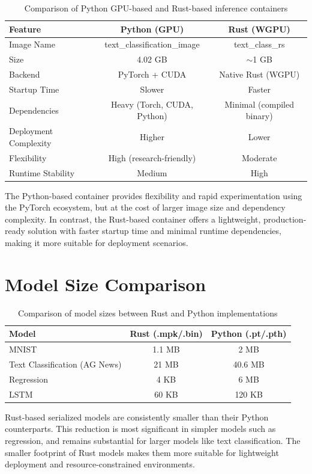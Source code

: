 \documentclass[11pt,a4paper]{article}
\begin{document}
\begin{table}[h]
\centering
\begin{tabular}{|l|c|c|}
\hline
\textbf{Feature} & \textbf{Python (GPU)} & \textbf{Rust (WGPU)} \\
\hline
Image Name & text\_classification\_image & text\_class\_rs \\
\hline
Size & 4.02 GB & $\sim$1 GB \\
\hline
Backend & PyTorch + CUDA & Native Rust (WGPU) \\
\hline
Startup Time & Slower & Faster \\
\hline
Dependencies & Heavy (Torch, CUDA, Python) & Minimal (compiled binary) \\
\hline
Deployment Complexity & Higher & Lower \\
\hline
Flexibility & High (research-friendly) & Moderate \\
\hline
Runtime Stability & Medium & High \\
\hline
\end{tabular}
\caption{Comparison of Python GPU-based and Rust-based inference containers}
\end{table}

\noindent
The Python-based container provides flexibility and rapid experimentation using the PyTorch ecosystem, but at the cost of larger image size and dependency complexity. In contrast, the Rust-based container offers a lightweight, production-ready solution with faster startup time and minimal runtime dependencies, making it more suitable for deployment scenarios.


\section{Model Size Comparison}

\begin{table}[h]
\centering
\begin{tabular}{|l|c|c|}
\hline
\textbf{Model} & \textbf{Rust (.mpk/.bin)} & \textbf{Python (.pt/.pth)} \\
\hline
MNIST & 1.1 MB & 2 MB \\
\hline
Text Classification (AG News) & 21 MB & 40.6 MB \\
\hline
Regression & 4 KB & 6 MB \\
\hline
LSTM & 60 KB & 120 KB \\
\hline
\end{tabular}
\caption{Comparison of model sizes between Rust and Python implementations}
\end{table}

\noindent
Rust-based serialized models are consistently smaller than their Python counterparts. This reduction is most significant in simpler models such as regression, and remains substantial for larger models like text classification. The smaller footprint of Rust models makes them more suitable for lightweight deployment and resource-constrained environments.
\end{document}
